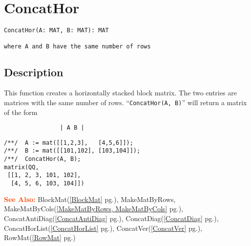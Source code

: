 \documentclass[a4paper]{mybook}
\newenvironment{command}{}{} %
\newcommand\SeeAlso{\par\textcolor{OrangeRed}{\textbf{\large See Also: }}}
\begin{document}
\section{ConcatHor}
\label{ConcatHor}
\begin{command} %


\begin{Verbatim}[label=syntax, rulecolor=\color{MidnightBlue},
frame=single]
ConcatHor(A: MAT, B: MAT): MAT

where A and B have the same number of rows
\end{Verbatim}


\subsection*{Description}

This function creates a horizontally stacked block matrix.  The
two entries are matrices with the same number of rows.
``\verb&ConcatHor(A, B)&'' will return a matrix of the form
\begin{verbatim}
                | A B |
\end{verbatim}
\begin{Verbatim}[label=example, rulecolor=\color{PineGreen}, frame=single]
/**/  A := mat([[1,2,3],   [4,5,6]]);
/**/  B := mat([[101,102], [103,104]]);
/**/  ConcatHor(A, B);
matrix(QQ,
 [[1, 2, 3, 101, 102],
  [4, 5, 6, 103, 104]])
\end{Verbatim}


\SeeAlso %
  BlockMat(\ref{BlockMat} pg.\pageref{BlockMat}), 
    MakeMatByRows, MakeMatByCols(\ref{MakeMatByRows, MakeMatByCols} pg.\pageref{MakeMatByRows, MakeMatByCols}), 
    ConcatAntiDiag(\ref{ConcatAntiDiag} pg.\pageref{ConcatAntiDiag}), 
    ConcatDiag(\ref{ConcatDiag} pg.\pageref{ConcatDiag}), 
    ConcatHorList(\ref{ConcatHorList} pg.\pageref{ConcatHorList}), 
    ConcatVer(\ref{ConcatVer} pg.\pageref{ConcatVer}), 
    RowMat(\ref{RowMat} pg.\pageref{RowMat})
\end{command} %
\end{document}
